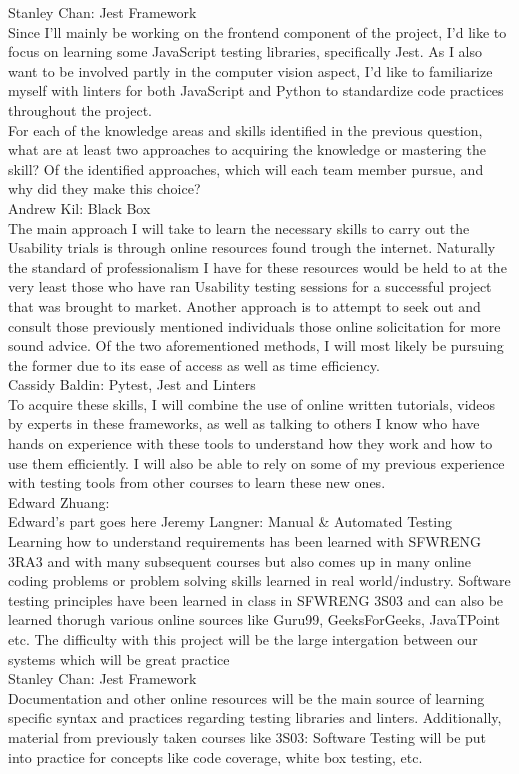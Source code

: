 \documentclass[12pt, titlepage]{article}
\begin{document}
\begin{outline}[enumerate]
    \2 Stanley Chan: Jest Framework \\
    Since I'll mainly be working on the frontend component of the project, I'd like to focus on learning some JavaScript testing libraries, specifically Jest. As I also want to be involved partly in the computer vision aspect, I'd like to familiarize myself with linters for both JavaScript and Python to standardize code practices throughout the project.\\
  \1 For each of the knowledge areas and skills identified in the previous
  question, what are at least two approaches to acquiring the knowledge or
  mastering the skill?  Of the identified approaches, which will each team
  member pursue, and why did they make this choice?\\
    \2 Andrew Kil: Black Box\\
    The main approach I will take to learn the necessary skills to carry out the Usability trials is through online resources found trough the internet. Naturally the standard of professionalism I have for these resources would be held to at the very least those who have ran Usability testing sessions for a successful project that was brought to market. Another approach is to attempt to seek out and consult those previously mentioned individuals those online solicitation for more sound advice. Of the two aforementioned methods, I will most likely be pursuing the former due to its ease of access as well as time efficiency.\\
    \2 Cassidy Baldin: Pytest, Jest and Linters\\
    To acquire these skills, I will combine the use of online written tutorials, videos by experts in these frameworks, as well as talking to others I know who have hands on experience with these tools to understand how they work and how to use them efficiently. I will also be able to rely on some of my previous experience with testing tools from other courses to learn these new ones.\\
    \2 Edward Zhuang: \\
	Edward's part goes here
    \2 Jeremy Langner: Manual \& Automated Testing\\
    Learning how to understand requirements has been learned with SFWRENG 3RA3 and with many subsequent courses but also comes up in many online coding problems or problem solving skills learned in real world/industry. Software testing principles have been learned in class in SFWRENG 3S03 and can also be learned thorugh various online sources like Guru99, GeeksForGeeks, JavaTPoint etc. The difficulty with this project will be the large intergation between our systems which will be great practice\\
    \2 Stanley Chan: Jest Framework\\
    Documentation and other online resources will be the main source of learning specific syntax and practices regarding testing libraries and linters. Additionally, material from previously taken courses like 3S03: Software Testing will be put into practice for concepts like code coverage, white box testing, etc.\\
\end{outline}
\end{document}
